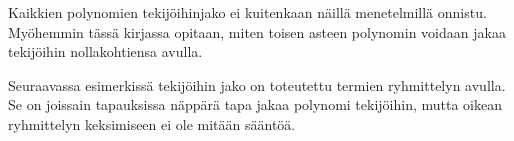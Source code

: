 %
%
%
%
%

Kaikkien polynomien tekijöihinjako ei kuitenkaan näillä menetelmillä onnistu. Myöhemmin tässä kirjassa opitaan, miten toisen asteen polynomin voidaan jakaa tekijöihin nollakohtiensa avulla.

Seuraavassa esimerkissä tekijöihin jako on toteutettu termien ryhmittelyn avulla. Se on joissain tapauksissa näppärä tapa jakaa polynomi tekijöihin, mutta oikean ryhmittelyn keksimiseen ei ole mitään sääntöä.

